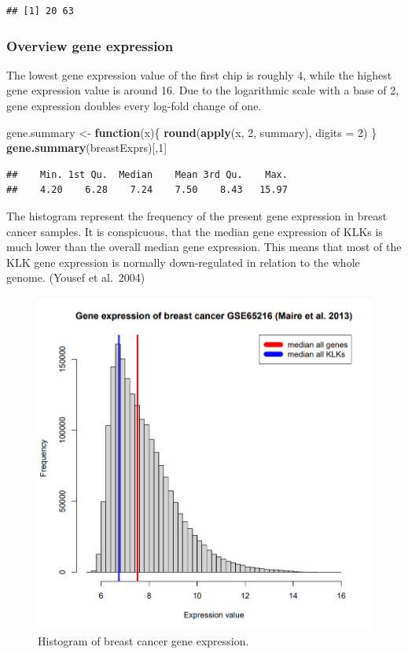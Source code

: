 \documentclass[
]{article}
\newenvironment{Shaded}{\begin{snugshade}}{\end{snugshade}}
\newcommand{\ControlFlowTok}[1]{\textcolor[rgb]{0.13,0.29,0.53}{\textbf{#1}}}
\newcommand{\DataTypeTok}[1]{\textcolor[rgb]{0.13,0.29,0.53}{#1}}
\newcommand{\DecValTok}[1]{\textcolor[rgb]{0.00,0.00,0.81}{#1}}
\newcommand{\KeywordTok}[1]{\textcolor[rgb]{0.13,0.29,0.53}{\textbf{#1}}}
\newcommand{\NormalTok}[1]{#1}
\newcommand{\StringTok}[1]{\textcolor[rgb]{0.31,0.60,0.02}{#1}}
\begin{document}
\begin{verbatim}
## [1] 20 63
\end{verbatim}

\hypertarget{overview-gene-expression}{%
\subsubsection{Overview gene
expression}\label{overview-gene-expression}}

The lowest gene expression value of the first chip is roughly 4, while
the highest gene expression value is around 16. Due to the logarithmic
scale with a base of 2, gene expression doubles every log-fold change of
one.

\begin{Shaded}
\begin{Highlighting}[]
\NormalTok{gene.summary <-}\StringTok{ }\ControlFlowTok{function}\NormalTok{(x)\{}
 \KeywordTok{round}\NormalTok{(}\KeywordTok{apply}\NormalTok{(x, }\DecValTok{2}\NormalTok{, summary), }\DataTypeTok{digits =} \DecValTok{2}\NormalTok{)}
\NormalTok{\}}
\KeywordTok{gene.summary}\NormalTok{(breastExprs)[,}\DecValTok{1}\NormalTok{]}
\end{Highlighting}
\end{Shaded}

\begin{verbatim}
##    Min. 1st Qu.  Median    Mean 3rd Qu.    Max. 
##    4.20    6.28    7.24    7.50    8.43   15.97
\end{verbatim}

The histogram represent the frequency of the present gene expression in
breast cancer samples. It is conspicuous, that the median gene
expression of KLKs is much lower than the overall median gene
expression. This means that most of the KLK gene expression is normally
down-regulated in relation to the whole genome. (Yousef et al.~2004)

\begin{figure}

{\centering \includegraphics[width=0.5\linewidth]{images/Histogram_breast} 

}

\caption{Histogram of breast cancer gene expression.}\label{fig:Histogram - breast }
\end{figure}
\end{document}
